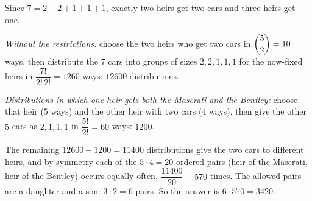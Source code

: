 Since $7=2+2+1+1+1$, exactly two heirs get two cars and three heirs get one.

\emph{Without the restrictions:} choose the two heirs who get two cars in $\dbinom52=10$ ways, then distribute the $7$ cars into groups of sizes $2,2,1,1,1$ for the now-fixed heirs in $\dfrac{7!}{2!\,2!}=1260$ ways: $12600$ distributions.

\emph{Distributions in which one heir gets both the Maserati and the Bentley:} choose that heir ($5$ ways) and the other heir with two cars ($4$ ways), then give the other $5$ cars as $2,1,1,1$ in $\dfrac{5!}{2!}=60$ ways: $1200$.

The remaining $12600-1200=11400$ distributions give the two cars to different heirs, and by symmetry each of the $5\cdot4=20$ ordered pairs (heir of the Maserati, heir of the Bentley) occurs equally often, $\dfrac{11400}{20}=570$ times. The allowed pairs are a daughter and a son: $3\cdot2=6$ pairs. So the answer is $6\cdot570=\boxed{3420}$.
